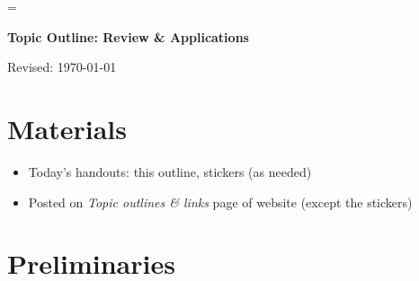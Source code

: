 \documentclass[11pt]{article}
\begin{document}
\parskip=\bigskipamount
\parindent=0.0in
\thispagestyle{empty}


\bigskip\bigskip
\centerline{\Large \bf Topic Outline:  Review \& Applications}
\centerline{Revised: \today}

\section*{Materials}

\begin{itemize}
\item  Today's handouts:  this outline, stickers (as needed)
\item  Posted on {\it Topic outlines \& links\/} page of website (except the stickers)
\end{itemize}

\section*{Preliminaries}
\end{document}
